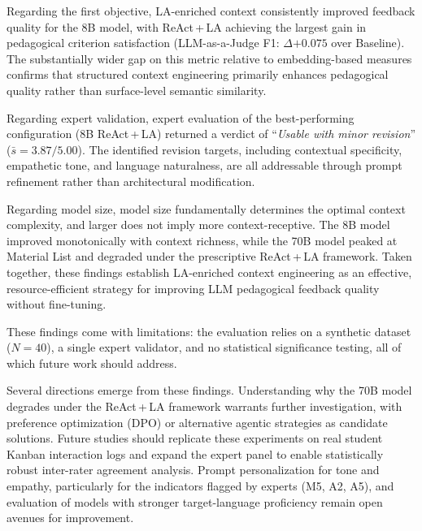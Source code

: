 \documentclass[conference,a4paper]{IEEEtran}
\begin{document}
Regarding the first objective, LA-enriched context
consistently improved feedback quality for the
8B model, with ReAct\,+\,LA achieving the
largest gain in pedagogical criterion
satisfaction (LLM-as-a-Judge F1:
$\Delta{+0.075}$ over Baseline). The
substantially wider gap on this metric relative
to embedding-based measures confirms that
structured context engineering primarily
enhances pedagogical quality rather than
surface-level semantic similarity.

Regarding expert validation, expert evaluation of
the best-performing configuration (8B
ReAct\,+\,LA) returned a verdict of
``\textit{Usable with minor revision}''
($\bar{s} = 3.87/5.00$). The identified
revision targets, including contextual specificity,
empathetic tone, and language naturalness, are
all addressable through prompt refinement
rather than architectural modification.

Regarding model size, model size
fundamentally determines the optimal context
complexity, and larger does not imply more
context-receptive. The 8B model improved
monotonically with context richness, while the
70B model peaked at Material List and degraded
under the prescriptive ReAct\,+\,LA framework.
Taken together, these findings establish
LA-enriched context engineering as an
effective, resource-efficient strategy for
improving LLM pedagogical feedback quality
without fine-tuning.

These findings come with limitations: the
evaluation relies on a synthetic dataset
($N = 40$), a single expert validator, and no
statistical significance testing, all of which
future work should address.

Several directions emerge from these findings. Understanding
why the 70B model degrades under the ReAct\,+\,LA
framework warrants further investigation, with preference
optimization (DPO) or alternative agentic strategies as
candidate solutions. Future studies should replicate these
experiments on real student Kanban interaction logs and
expand the expert panel to enable statistically robust
inter-rater agreement analysis. Prompt personalization
for tone and empathy, particularly for the indicators
flagged by experts (M5, A2, A5), and evaluation of models
with stronger target-language proficiency remain open
avenues for improvement.
\end{document}
